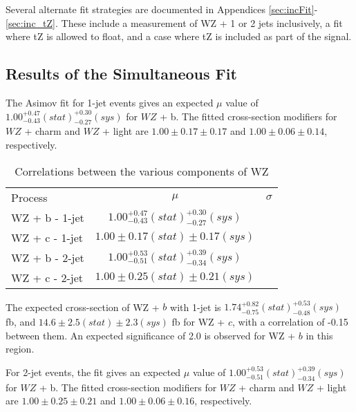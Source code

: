 Several alternate fit strategies are documented in Appendices \ref{sec:incFit}-\ref{sec:inc_tZ}. These include a measurement of WZ + 1 or 2 jets inclusively, a fit where tZ is allowed to float, and a case where tZ is included as part of the signal.

\subsection{Results of the Simultaneous Fit}
\label{sec:resSum}

The Asimov fit for 1-jet events gives an expected $\mu$ value of $1.00^{+0.47}_{-0.43}(stat)^{+0.30}_{-0.27}(sys)$ for $WZ$ + b. The fitted cross-section modifiers for $WZ$ + charm and $WZ$ + light are $1.00 \pm 0.17 \pm 0.17$ and $1.00 \pm 0.06 \pm 0.14 $, respectively.

\hspace{-1in}\begin{table}[H]
\begin{adjustwidth}{-3em}{-3em}
\begin{center}
\begin{tabular}{l|cc}
\hline
Process & $\mu$ & $\sigma$ \\
WZ + b - 1-jet & $1.00^{+0.47}_{-0.43}(stat)^{+0.30}_{-0.27}(sys)$ & \\
WZ + c - 1-jet & $1.00 \pm 0.17(stat) \pm 0.17(sys)$ & \\
WZ + b - 2-jet & $1.00^{+0.53}_{-0.51}(stat)^{+0.39}_{-0.34}(sys)$ & \\
WZ + c - 2-jet & $1.00 \pm 0.25(stat) \pm 0.21(sys)$ & \\
\hline
\end{tabular}
\caption{Correlations between the various components of WZ}
\label{tab:WZ_res }
\end{center}
\end{adjustwidth}
\end{table}

The expected cross-section of WZ + $b$ with 1-jet is $1.74^{+0.82}_{-0.75}(stat)^{+0.53}_{-0.48}(sys)$ fb, and $14.6 \pm 2.5 (stat) \pm 2.3 (sys)$ fb for WZ + $c$, with a correlation of -0.15 between them. An expected significance of 2.0 is observed for WZ + $b$ in this region. 

For 2-jet events, the fit gives an expected $\mu$ value of $1.00^{+0.53}_{-0.51}(stat)^{+0.39}_{-0.34}(sys)$ for $WZ$ + b. The fitted cross-section modifiers for $WZ$ + charm and $WZ$ + light are $1.00 \pm 0.25 \pm 0.21$ and $1.00 \pm 0.06 \pm 0.16 $, respectively.

